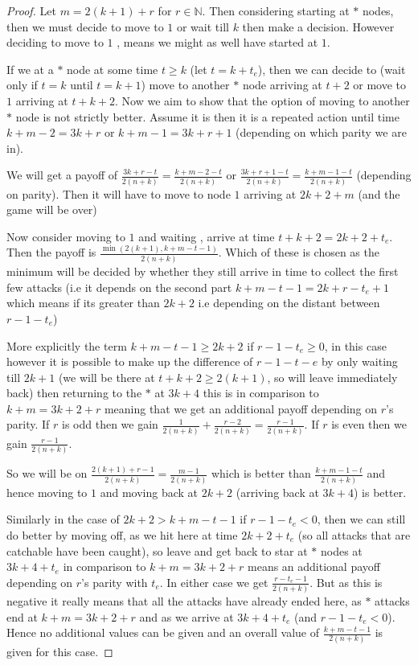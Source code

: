 \documentclass[a4paper,10pt]{article}
\theoremstyle{definition}
\theoremstyle{definition}
\theoremstyle{remark}
\theoremstyle{definition}
\begin{document}
\begin{proof}
Let $m=2(k+1)+r$ for $r \in \mathbb{N}$.
Then considering starting at $*$ nodes, then we must decide to move to $1$ or wait till $k$ then make a decision. However deciding to move to $1$ , means we might as well have started at $1$.

If we at a $*$ node at some time $t \geq k$ (let $t=k+t_{e}$), then we can decide to (wait only if $t=k$ until $t=k+1$) move to another $*$ node arriving at $t+2$ or move to $1$ arriving at $t+k+2$. Now we aim to show that the option of moving to another $*$ node is not strictly better. Assume it is then it is a repeated action until time $k+m-2=3k+r$ or $k+m-1=3k+r+1$ (depending on which parity we are in).

We will get a payoff of $\frac{3k+r-t}{2(n+k)}=\frac{k+m-2-t}{2(n+k)}$ or $\frac{3k+r+1-t}{2(n+k)}=\frac{k+m-1-t}{2(n+k)}$ (depending on parity). Then it will have to move to node $1$ arriving at $2k+2+m$ (and the game will be over)

Now consider moving to $1$ and waiting , arrive at time $t+k+2=2k+2+t_{e}$. Then the payoff is $\frac{\min(2(k+1),k+m-t-1)}{2(n+k)}$. Which of these is chosen as the minimum will be decided by whether they still arrive in time to collect the first few attacks (i.e it depends on the second part $k+m-t-1=2k+r-t_{e}+1$ which means if its greater than $2k+2$ i.e depending on the distant between $r-1-t_{e}$)

More explicitly the term $k+m-t-1 \geq 2k+2$ if $r-1-t_{e} \geq 0$, in this case however it is possible to make up the difference of $r-1-t-{e}$ by only waiting till $2k+1$ (we will be there at $t+k+2 \geq 2(k+1)$, so will leave immediately back) then returning to the $*$ at $3k+4$ this is in comparison to $k+m=3k+2+r$ meaning that we get an additional payoff depending on $r$'s parity.
If $r$ is odd then we gain $\frac{1}{2(n+k)}+\frac{r-2}{2(n+k)}=\frac{r-1}{2(n+k)}$.
If $r$ is even then we gain $\frac{r-1}{2(n+k)}$.

So we will be on $\frac{2(k+1)+r-1}{2(n+k)}=\frac{m-1}{2(n+k)}$ which is better than $\frac{k+m-1-t}{2(n+k)}$ and hence moving to $1$ and moving back at $2k+2$ (arriving back at $3k+4$) is better.

Similarly in the case of $2k+2> k+m-t-1$ if $r-1-t_{e} < 0$, then we can still do better by moving off, as we hit here at time $2k+2+t_{e}$ (so all attacks that are catchable have been caught), so leave and get back to star at $*$ nodes at $3k+4+t_{e}$ in comparison to $k+m=3k+2+r$ means an additional payoff depending on $r$'s parity with $t_{e}$.
In either case we get $\frac{r-t_{e}-1}{2(n+k)}$. But as this is negative it really means that all the attacks have already ended here, as $*$ attacks end at $k+m=3k+2+r$ and as we arrive at $3k+4+t_{e}$ (and $r-1-t_{e} < 0$). 
Hence no additional values can be given and an overall value of $\frac{k+m-t-1}{2(n+k)}$ is given for this case.


\end{proof}
\end{document}
